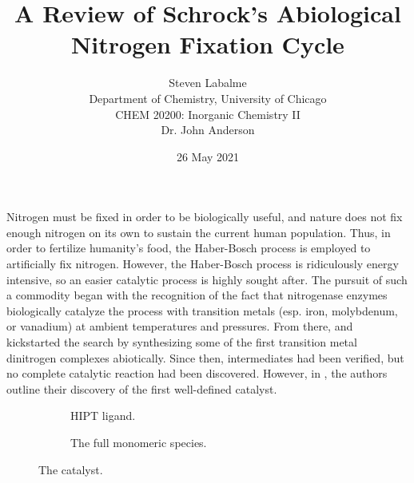 \documentclass[titlepage,12pt]{article}
\title{A Review of Schrock's Abiological Nitrogen Fixation Cycle}
\author{
    Steven Labalme\\
    Department of Chemistry, University of Chicago\\
    CHEM 20200: Inorganic Chemistry II\\
    Dr. John Anderson
}
\date{26 May 2021}
\begin{document}
\begin{doublespace}
    \maketitle
\end{doublespace}



Nitrogen must be fixed in order to be biologically useful, and nature does not fix enough nitrogen on its own to sustain the current human population. Thus, in order to fertilize humanity’s food, the Haber-Bosch process is employed to artificially fix nitrogen. However, the Haber-Bosch process is ridiculously energy intensive, so an easier catalytic process is highly sought after. The pursuit of such a commodity began with the recognition of the fact that nitrogenase enzymes biologically catalyze the process with transition metals (esp. iron, molybdenum, or vanadium) at ambient temperatures and pressures. From there, \textcite{bib:AllenSenoff} and \textcite{bib:Yamamoto} kickstarted the search by synthesizing some of the first transition metal dinitrogen complexes abiotically. Since then, intermediates had been verified, but no complete catalytic reaction had been discovered. However, in \textcite{bib:SchrockYandulov}, the authors outline their discovery of the first well-defined catalyst.

\begin{figure}[h!]
    \centering
    \begin{subfigure}[b]{0.49\linewidth}
        \centering
        \caption{HIPT ligand.}
        \label{fig:catalysta}
    \end{subfigure}
    \begin{subfigure}[b]{0.49\linewidth}
        \centering
        \caption{The full monomeric species.}
        \label{fig:catalystb}
    \end{subfigure}
    \caption{The catalyst.}
    \label{fig:catalyst}
\end{figure}
\end{document}
